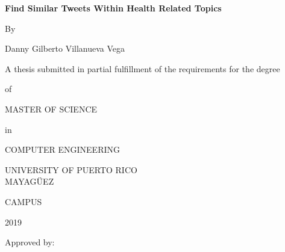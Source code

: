 \documentclass[12pt]{report}
\begin{document}
	\newtheorem{definition}{Example}
	
	\newtheorem{property}{Property}
	
	
	\begin{titlepage}
		\centering 
		{\LARGE \textbf {Find Similar Tweets Within Health Related Topics}\par}
		\vspace{1cm}
		{By\par}
		{Danny Gilberto Villanueva Vega\par}    
		{A thesis submitted in partial fulfillment of the requirements for the degree \par}
		\vspace{.1cm}
		{of\par}
		\vspace{.1cm}
		{MASTER OF SCIENCE\par}
		{in\par}
		{COMPUTER ENGINEERING\par}
		{UNIVERSITY OF PUERTO RICO
			\\MAYAG\"UEZ}{  CAMPUS\par}
		{2019}
		\vspace{.1cm}
		\begin{flushleft}
			Approved by:\\
			\vspace{1cm}
		\end{flushleft}
		\begin{tabular}{l c c c c c r}
			

\end{tabular}
\end{titlepage}
\end{document}
